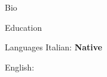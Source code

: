 \documentclass{cv}
\begin{document}
\begin{resume}
  \begin{cvsection}{\faCoffee}{Bio}
  \end{cvsection}
  \begin{cvsection}{\faGraduationCap}{Education}
  \end{cvsection}
  \begin{cvsection}{\faCommentsAlt}{Languages}
    {\large Italian:} \textbf{Native}

    \medskip
    {\large English:}
  \end{cvsection}
\end{resume}
\end{document}
